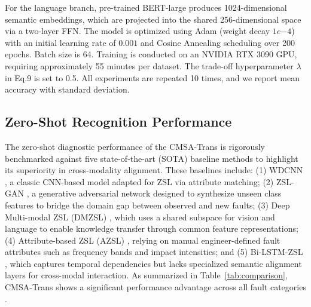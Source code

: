 \documentclass[journal]{IEEEtran}
\begin{document}
For the language branch, pre-trained BERT-large produces 1024-dimensional semantic embeddings, which are projected into the shared 256-dimensional space via a two-layer FFN. The model is optimized using Adam (weight decay $1e{-4}$) with an initial learning rate of $0.001$ and Cosine Annealing scheduling over 200 epochs. Batch size is 64. Training is conducted on an NVIDIA RTX 3090 GPU, requiring approximately 55 minutes per dataset. The trade-off hyperparameter $\lambda$ in Eq.9 is set to 0.5. All experiments are repeated 10 times, and we report mean accuracy with standard deviation.


\subsection{Zero-Shot Recognition Performance}
The zero-shot diagnostic performance of the CMSA-Trans is rigorously benchmarked against five state-of-the-art (SOTA) baseline methods to highlight its superiority in cross-modality alignment. These baselines include: (1) WDCNN \cite{zhang2017new}, a classic CNN-based model adapted for ZSL via attribute matching; (2) ZSL-GAN \cite{xian2019fvaegan}, a generative adversarial network designed to synthesize unseen class features to bridge the domain gap between observed and new faults; (3) Deep Multi-modal ZSL (DMZSL) \cite{schonfeld2019generalized}, which uses a shared subspace for vision and language to enable knowledge transfer through common feature representations; (4) Attribute-based ZSL (AZSL) \cite{lampert2014attribute}, relying on manual engineer-defined fault attributes such as frequency bands and impact intensities; and (5) Bi-LSTM-ZSL \cite{chen2019bearing}, which captures temporal dependencies but lacks specialized semantic alignment layers for cross-modal interaction. As summarized in Table~\ref{tab:comparison}, CMSA-Trans shows a significant performance advantage across all fault categories \cite{li2022zero, lu2017deep}.
\end{document}
